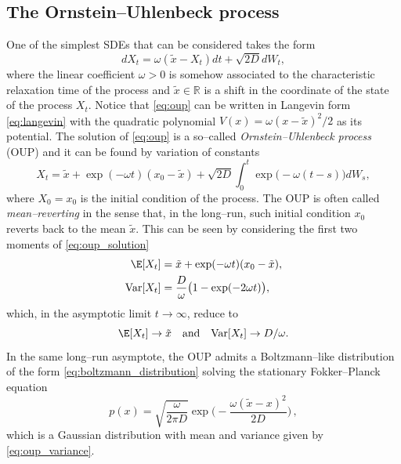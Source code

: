 \subsection{The Ornstein--Uhlenbeck process}\label{subsec:oup}
One of the simplest SDEs that can be considered takes the form 
%
\begin{equation}\label{eq:oup}
  dX_{t} = \omega(\tilde{x} - X_{t})dt + \sqrt{2D}dW_{t},
\end{equation}
%
where the linear coefficient $\omega>0$ is somehow associated to the characteristic relaxation time of the process and $\tilde{x}\in\mathbb{R}$ is a shift in the coordinate of the state of the process $X_t$.
Notice that \eqref{eq:oup} can be written in Langevin form \eqref{eq:langevin} with the quadratic polynomial $V(x) = \omega(x - \tilde{x})^2/2$ as its potential. 
The solution of \eqref{eq:oup} is a so--called \emph{Ornstein--Uhlenbeck process} (OUP) and it can be found by variation of constants
%
\begin{equation}\label{eq:oup_solution}
  X_{t} = \tilde{x} + \exp(-\omega t)(x_0 - \tilde{x}) + \sqrt{2D}\int_{0}^{t}\exp\bigl(-\omega(t - s)\bigr)dW_s,
\end{equation}
%
where $X_0=x_0$ is the initial condition of the process.
The OUP is often called \emph{mean--reverting} in the sense that, in the long--run, such initial condition $x_0$ reverts back to the mean $\tilde{x}$.
This can be seen by considering the first two moments of \eqref{eq:oup_solution}
%
\begin{align*}
  \E[X_t] &= \tilde{x} + \exp(-\omega t)(x_0 - \tilde{x}), \\
  \text{Var}[X_t] &= \frac{D}{\omega}\bigl(1 - \exp(-2\omega t)\bigr) ,
\end{align*}
%
which, in the asymptotic limit $t\to\infty$, reduce to
%
\begin{equation}\label{eq:oup_variance}
  \E[X_t] \to \tilde{x}\quad \text{and} \quad \text{Var}[X_t] \to D/\omega.
\end{equation}
%
In the same long--run asymptote, the OUP admits a Boltzmann--like distribution of the form \eqref{eq:boltzmann_distribution} solving the stationary Fokker--Planck equation
%
\begin{equation}\label{eq:oup_distribution}
  p(x) = \sqrt{\frac{\omega}{2\pi D}}\exp\bigg(-\frac{\omega(\tilde{x} - x)^{2}}{2D}\bigg)\,,
\end{equation}
%
which is a Gaussian distribution with mean and variance given by \eqref{eq:oup_variance}.

